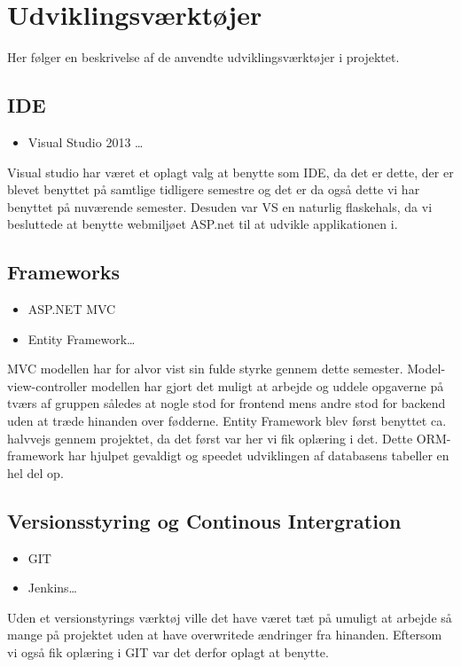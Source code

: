 \section{Udviklingsværktøjer} 

Her følger en beskrivelse af de anvendte udviklingsværktøjer i projektet.

\subsection*{IDE}
\begin{itemize}
  \item Visual Studio 2013 \ldots
\end{itemize}
Visual studio har været et oplagt valg at benytte som IDE, da det er dette, der er blevet benyttet på samtlige tidligere semestre og det er da også dette vi har benyttet på nuværende semester. Desuden var VS en naturlig flaskehals, da vi besluttede at benytte webmiljøet ASP.net til at udvikle applikationen i.

\subsection*{Frameworks} 
\begin{itemize}
  \item ASP.NET MVC
  \item Entity Framework\ldots
\end{itemize}
MVC modellen har for alvor vist sin fulde styrke gennem dette semester. Model-view-controller modellen har gjort det muligt at arbejde og uddele opgaverne på tværs af gruppen således at nogle stod for frontend mens andre stod for backend uden at træde hinanden over fødderne.
Entity Framework blev først benyttet ca. halvvejs gennem projektet, da det først var her vi fik oplæring i det. Dette ORM-framework har hjulpet gevaldigt og speedet udviklingen af databasens tabeller en hel del op.  

\subsection*{Versionsstyring og Continous Intergration} 
\begin{itemize}
  \item GIT
  \item Jenkins\ldots
\end{itemize}
Uden et versionstyrings værktøj ville det have været tæt på umuligt at arbejde så mange på projektet uden at have overwritede ændringer fra hinanden. Eftersom vi også fik oplæring i GIT var det derfor oplagt at benytte.

